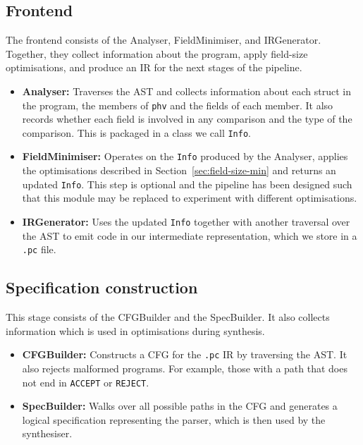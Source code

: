\subsection*{Frontend}

The frontend consists of the Analyser, FieldMinimiser, and IRGenerator. Together, they collect information about the program, apply field-size optimisations, and produce an IR for the next stages of the pipeline.

\begin{itemize}
    \item \textbf{Analyser:} Traverses the AST and collects information about each struct in the program, the members of \texttt{phv}
    and the fields of each member. It also records whether each field is involved in any comparison
    and the type of the comparison. This is packaged in a class we call \texttt{Info}.

    \item \textbf{FieldMinimiser:} Operates on the \texttt{Info} produced by the Analyser, applies the optimisations described in Section~\ref{sec:field-size-min} and returns an updated \texttt{Info}. This step is optional and the pipeline has been designed such that this module may be replaced to experiment with different optimisations.

    \item \textbf{IRGenerator:} Uses the updated \texttt{Info} together with another traversal over the AST to emit code in our intermediate representation, which we store in a \texttt{.pc} file.
\end{itemize}

\subsection*{Specification construction}

This stage consists of the CFGBuilder and the SpecBuilder. It also collects information which is used in optimisations during synthesis.

\begin{itemize}
    \item \textbf{CFGBuilder:} Constructs a CFG for the \texttt{.pc} IR by traversing the AST. It also rejects malformed programs. For example, those with a path that does not end in \texttt{ACCEPT} or \texttt{REJECT}.

    \item \textbf{SpecBuilder:} Walks over all possible paths in the CFG and generates a logical specification representing the parser, which is then used by the synthesiser.
\end{itemize}

